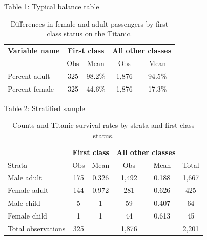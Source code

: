 \documentclass{beamer}
\begin{document}
\begin{frame}{Table 1: Typical balance table}

{\renewcommand{\arraystretch}{1.1}
\tabcolsep 		
\begin{table}\small{}
\caption{Differences in female and adult passengers by first class status on the Titanic. }
\centering
\begin{tabular}{lcc|cc}
\toprule
\multicolumn{1}{c}{\textbf{Variable name}}&
\multicolumn{2}{c}{\textbf{First class}}&
\multicolumn{2}{c}{\textbf{All other classes}}\\
\multicolumn{1}{c}{}&
\multicolumn{1}{c}{Obs}&
\multicolumn{1}{c}{Mean}&
\multicolumn{1}{c}{Obs}&
\multicolumn{1}{c}{Mean}\\
\midrule
Percent adult		&	325 	& 98.2\% & 1,876 & 94.5\% \\
Percent female		& 	325	& 44.6\% & 1,876 & 17.3\% \\
\bottomrule
\end{tabular}
\label{tab:titanic-age}
\end{table}}
\end{frame}


\begin{frame}{Table 2: Stratified sample}

{\renewcommand{\arraystretch}{1.1}
\tabcolsep 		
\begin{table}\small{}
\caption{Counts and Titanic survival rates by strata and first class status.}
\centering
\begin{tabular}{lcc|cc|c}
\toprule
\multicolumn{1}{c}{\textbf{}}&
\multicolumn{2}{c}{\textbf{First class}}&
\multicolumn{2}{c}{\textbf{All other classes}}&
\multicolumn{1}{c}{\textbf{}}\\
\multicolumn{1}{l}{Strata}&
\multicolumn{1}{c}{Obs}&
\multicolumn{1}{c}{Mean}&
\multicolumn{1}{c}{Obs}&
\multicolumn{1}{c}{Mean}&
\multicolumn{1}{c}{Total}\\
\midrule
Male adult		& 175	& 0.326	& 1,492	& 0.188	& 1,667 \\
Female adult	& 144	& 0.972	& 281	& 0.626	& 425 \\
Male child		& 5		& 1		& 59		& 0.407 	& 64\\
Female child	& 1		& 1		& 44		& 0.613 	& 45\\
\midrule
Total	observations	& 325	&&	1,876	 && 2,201\\
\bottomrule
\end{tabular}
\label{tab:titanic-counts}
\end{table}}


\end{frame}
\end{document}
